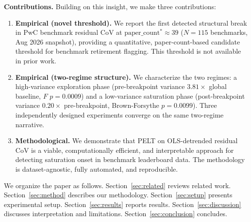 \textbf{Contributions.} Building on this insight, we make three contributions:

\begin{enumerate}
\item \textbf{Empirical (novel threshold).} We report the first detected structural break in PwC benchmark residual CoV at $\text{paper\_count}^* \approx 39$ ($N=115$ benchmarks, Aug 2026 snapshot), providing a quantitative, paper-count-based candidate threshold for benchmark retirement flagging. This threshold is not available in prior work.

\item \textbf{Empirical (two-regime structure).} We characterize the two regimes: a high-variance exploration phase (pre-breakpoint variance $3.81\times$ global baseline, $F$ $p=0.0009$) and a low-variance saturation phase (post-breakpoint variance $0.20\times$ pre-breakpoint, Brown-Forsythe $p=0.0099$). Three independently designed experiments converge on the same two-regime narrative.

\item \textbf{Methodological.} We demonstrate that PELT on OLS-detrended residual CoV is a viable, computationally efficient, and interpretable approach for detecting saturation onset in benchmark leaderboard data. The methodology is dataset-agnostic, fully automated, and reproducible.
\end{enumerate}

We organize the paper as follows. Section~\ref{sec:related} reviews related work. Section~\ref{sec:method} describes our methodology. Section~\ref{sec:setup} presents experimental setup. Section~\ref{sec:results} reports results. Section~\ref{sec:discussion} discusses interpretation and limitations. Section~\ref{sec:conclusion} concludes.
